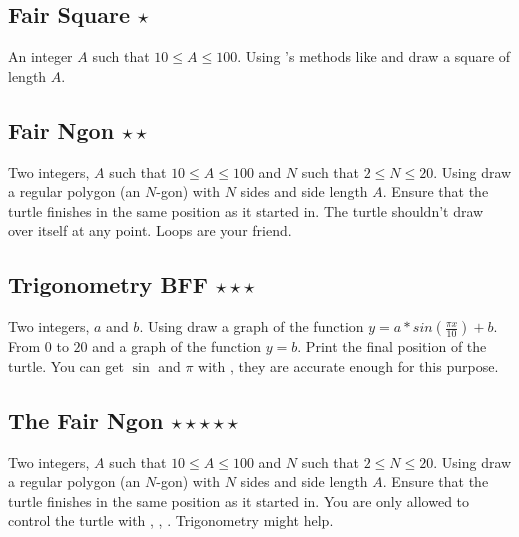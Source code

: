
\subsection{Fair Square $\star$}
\In
An integer $A$ such that $10 \leq A \leq 100$.
\Out
Using 's methods like 
 and  draw a square of length $A$.

\subsection{Fair Ngon $\star\star$}
\In
Two integers, $A$ such that $10 \leq A \leq 100$ and $N$
such that $2 \leq N \leq 20$.
\Out
Using  draw a regular polygon (an $N$-gon) with $N$ sides and side
length $A$. Ensure that the turtle finishes in the same position as it started
in. The turtle shouldn't draw over itself at any point.
\Hint
Loops are your friend.

\subsection{Trigonometry BFF $\star\star\star$}
\In
Two integers, $a$ and $b$.
\Out
Using  draw a graph of the function $y = a * sin(\frac{\pi x}{10}) + b$.
From $0$ to $20$ and a graph of the function $y = b$. Print the final position
of the turtle.
\Hint
You can get $\sin$ and $\pi$ with , they are accurate
enough for this purpose.

\subsection{The Fair Ngon $\star\star\star\star\star$}
\In
Two integers, $A$ such that $10 \leq A \leq 100$ and $N$
such that $2 \leq N \leq 20$.
\Out
Using  draw a regular polygon (an $N$-gon) with $N$ sides and side
length $A$. Ensure that the turtle finishes in the same position as it started
in. You are only allowed to control the turtle with , ,
.
\Hint
Trigonometry might help.
